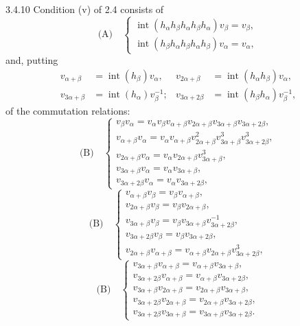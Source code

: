 \begin{remark}{3.4.10}\label{XXIII.3.4.10}
Condition (v) of 2.4 consists of
\[
\text{(A)}\quad\begin{cases}
\operatorname{int}(h_\alpha h_\beta h_\alpha h_\beta h_\alpha)v_\beta=v_\beta,\\
\operatorname{int}(h_\beta h_\alpha h_\beta h_\alpha h_\beta)v_\alpha=v_\alpha,
\end{cases}
\]
and, putting
\[
\begin{aligned}
v_{\alpha+\beta}&=\operatorname{int}(h_\beta)v_\alpha,&v_{2\alpha+\beta}&=\operatorname{int}(h_\alpha h_\beta)v_\alpha,\\
v_{3\alpha+\beta}&=\operatorname{int}(h_\alpha)v_\beta^{-1};&v_{3\alpha+2\beta}&=\operatorname{int}(h_\beta h_\alpha)v_\beta^{-1},
\end{aligned}
\]
of the commutation relations:
\[
\text{(B)}\quad\begin{cases}
v_\beta v_\alpha=v_\alpha v_\beta v_{\alpha+\beta}v_{2\alpha+\beta}v_{3\alpha+\beta}v_{3\alpha+2\beta},\\
v_{\alpha+\beta}v_\alpha=v_\alpha v_{\alpha+\beta}v_{2\alpha+\beta}^2v_{3\alpha+\beta}^3v_{3\alpha+2\beta}^3,\\
v_{2\alpha+\beta}v_\alpha=v_\alpha v_{2\alpha+\beta}v_{3\alpha+\beta}^3,\\
v_{3\alpha+\beta}v_\alpha=v_\alpha v_{3\alpha+\beta},\\
v_{3\alpha+2\beta}v_\alpha=v_\alpha v_{3\alpha+2\beta},
\end{cases}
\]
\[
\text{(B)}\quad\begin{cases}
v_{\alpha+\beta}v_\beta=v_\beta v_{\alpha+\beta},\\
v_{2\alpha+\beta}v_\beta=v_\beta v_{2\alpha+\beta},\\
v_{3\alpha+\beta}v_\beta=v_\beta v_{3\alpha+\beta}v_{3\alpha+2\beta}^{-1},\\
v_{3\alpha+2\beta}v_\beta=v_\beta v_{3\alpha+2\beta},\\
v_{2\alpha+\beta}v_{\alpha+\beta}=v_{\alpha+\beta}v_{2\alpha+\beta}v_{3\alpha+2\beta}^3,
\end{cases}
\]
\[
\text{(B)}\quad\begin{cases}
v_{3\alpha+\beta}v_{\alpha+\beta}=v_{\alpha+\beta}v_{3\alpha+\beta},\\
v_{3\alpha+2\beta}v_{\alpha+\beta}=v_{\alpha+\beta}v_{3\alpha+2\beta},\\
v_{3\alpha+\beta}v_{2\alpha+\beta}=v_{2\alpha+\beta}v_{3\alpha+\beta},\\
v_{3\alpha+2\beta}v_{2\alpha+\beta}=v_{2\alpha+\beta}v_{3\alpha+2\beta},\\
v_{3\alpha+2\beta}v_{3\alpha+\beta}=v_{3\alpha+\beta}v_{3\alpha+2\beta}.
\end{cases}
\]
\end{remark}

